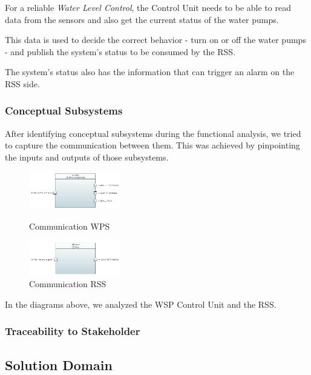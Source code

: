 \documentclass[11pt]{article}
\begin{document}
For a reliable \textit{Water Level Control}, the Control Unit needs to be able to read data from the sensors and also get the current status of the water pumps.

This data is used to decide the correct behavior - turn on or off the water pumps - and publish the system's status to be consumed by the RSS.

The system's status also has the information that can trigger an alarm on the RSS side.

\subsubsection{Conceptual Subsystems}

After identifying conceptual subsystems during the functional analysis, we tried to capture the communication between them. This was achieved by pinpointing  the inputs and outputs of those subsystems.

\begin{figure}[H]
\centering
\begin{minipage}{.5\linewidth}
  \centering
  \includegraphics[width=150px]{../diagrams/conceptual-subsystem-communication-wps.png}
  \caption{Communication WPS}
  \label{fig:Conceptual Subsystem 1}
\end{minipage}%
\begin{minipage}{.5\linewidth}
  \centering
  \includegraphics[width=150px]{../diagrams/conceptual-subsystem-communication-rss.png}
  \caption{Communication RSS}
  \label{fig:Conceptual Subsystem 2}
\end{minipage}
\end{figure}

In the diagrams above, we analyzed the WSP Control Unit and the RSS.

\subsubsection{Traceability to Stakeholder}

\subsection{Solution Domain}
\end{document}
